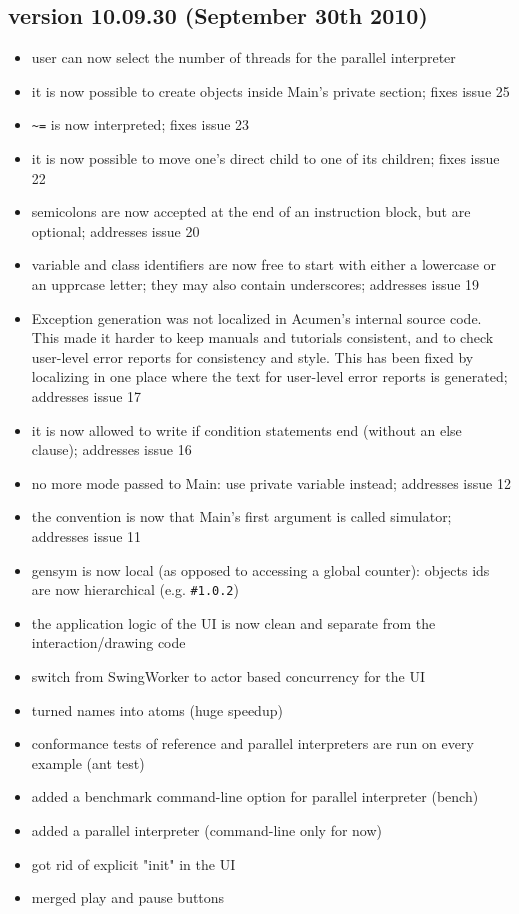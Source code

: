 \subsection{version 10.09.30 (September 30th 2010)}

\begin{itemize}
    \item user can now select the number of threads for the parallel interpreter
    \item it is now possible to create objects inside Main's private section; fixes  issue 25 
    \item \lstinline{~=} is now interpreted; fixes  issue 23 
    \item it is now possible to move one's direct child to one of its children; fixes  issue 22 
    \item semicolons are now accepted at the end of an instruction block, but are optional; addresses  issue 20 
    \item variable and class identifiers are now free to start with either a lowercase or an upprcase letter; they may also contain underscores; addresses  issue 19 
    \item Exception generation was not localized in Acumen's internal source code. This made it harder to keep manuals and tutorials consistent, and to check user-level error reports for consistency and style. This has been fixed by localizing in one place where the text for user-level error reports is generated; addresses  issue 17 
    \item it is now allowed to write if condition statements end (without an else clause); addresses  issue 16 
    \item no more mode passed to Main: use private variable instead; addresses  issue 12 
    \item the convention is now that Main's first argument is called simulator; addresses  issue 11 
    \item gensym is now local (as opposed to accessing a global counter): objects ids are now hierarchical (e.g. \lstinline{#1.0.2})
    \item the application logic of the UI is now clean and separate from the interaction/drawing code
    \item switch from SwingWorker to actor based concurrency for the UI
    \item turned names into atoms (huge speedup)
    \item conformance tests of reference and parallel interpreters are run on every example (ant test)
    \item added a benchmark command-line option for parallel interpreter (bench)
    \item added a parallel interpreter (command-line only for now)
    \item got rid of explicit "init" in the UI
    \item merged play and pause buttons
\end{itemize}
